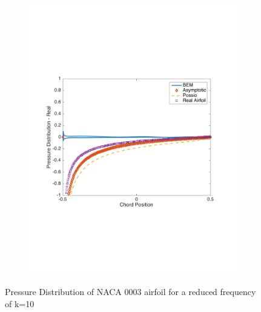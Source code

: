 \documentclass{article}
\begin{document}
\begin{figure}[h]
\begin{subfigure}{0.33\textwidth}
	\includegraphics[width = \textwidth, height=0.16\textheight]{NACA0003_pressure_k10real}
\end{subfigure}%
\caption{Pressure Distribution of NACA 0003 airfoil for a reduced frequency of k=10}
\end{figure}
\end{document}
